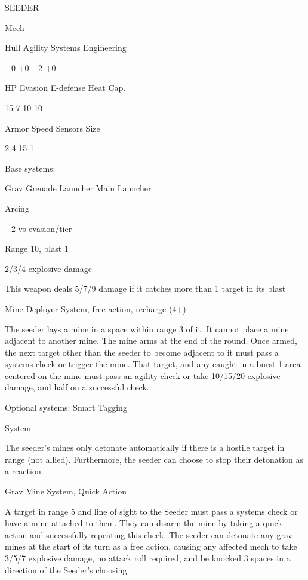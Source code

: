  SEEDER 

 Mech 

 Hull       Agility      Systems       Engineering 

 +0         +0           +2            +0 

 HP         Evasion      E-defense     Heat Cap. 

 15         7            10            10 

 Armor      Speed        Sensors       Size 

 2          4            15            1 

Base systems:
 
Grav Grenade Launcher  
Main Launcher
 
Arcing
 
+2 vs evasion/tier
 
Range 10, blast 1
 
2/3/4 explosive damage
 
This weapon deals 5/7/9 damage if it catches more than 1 target in its blast
 

Mine Deployer  
System, free action, recharge (4+)
 
The seeder lays a mine in a space within range 3 of it. It cannot place a mine adjacent to another  
mine. The mine arms at the end of the round. Once armed, the next target other than the seeder  
to become adjacent to it must pass a systems check or trigger the mine. That target, and any  
caught in a burst 1 area centered on the mine must pass an agility check or take 10/15/20  
explosive damage, and half on a successful check.
 

Optional systems:  
Smart Tagging
 
System
 
The seeder’s mines only detonate automatically if there is a hostile target in range (not allied).  
Furthermore, the seeder can choose to stop their detonation as a reaction.
 

                                                                                                          


Grav Mine  
System, Quick Action
 
A target in range 5 and line of sight to the Seeder must pass a systems check or have a mine  
attached to them. They can disarm the mine by taking a quick action and successfully repeating  
this check. The seeder can detonate any grav mines at the start of its turn as a free action,  
causing any affected mech to take 3/5/7 explosive damage, no attack roll required, and be  
knocked 3 spaces in a direction of the Seeder’s choosing.
 

